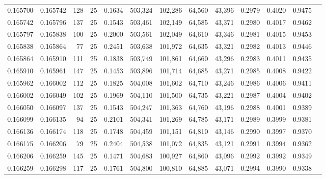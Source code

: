 \begin{tabular}{rrrrrrrrrrrrr}
0.165700 & 0.165742 &   128 &  25 &                                     0.1634 & 503,324 & 102,286 &  64,560 &  43,396 & 0.2979 & 0.4020 & 0.9475 \\
0.165742 & 0.165796 &   137 &  25 &                                     0.1543 & 503,461 & 102,149 &  64,585 &  43,371 & 0.2980 & 0.4017 & 0.9462 \\
0.165797 & 0.165838 &   100 &  25 &                                     0.2000 & 503,561 & 102,049 &  64,610 &  43,346 & 0.2981 & 0.4015 & 0.9453 \\
0.165838 & 0.165864 &    77 &  25 &                                     0.2451 & 503,638 & 101,972 &  64,635 &  43,321 & 0.2982 & 0.4013 & 0.9446 \\
0.165864 & 0.165910 &   111 &  25 &                                     0.1838 & 503,749 & 101,861 &  64,660 &  43,296 & 0.2983 & 0.4011 & 0.9435 \\
0.165910 & 0.165961 &   147 &  25 &                                     0.1453 & 503,896 & 101,714 &  64,685 &  43,271 & 0.2985 & 0.4008 & 0.9422 \\
0.165962 & 0.166002 &   112 &  25 &                                     0.1825 & 504,008 & 101,602 &  64,710 &  43,246 & 0.2986 & 0.4006 & 0.9411 \\
0.166002 & 0.166049 &   102 &  25 &                                     0.1969 & 504,110 & 101,500 &  64,735 &  43,221 & 0.2987 & 0.4004 & 0.9402 \\
0.166050 & 0.166097 &   137 &  25 &                                     0.1543 & 504,247 & 101,363 &  64,760 &  43,196 & 0.2988 & 0.4001 & 0.9389 \\
0.166099 & 0.166135 &    94 &  25 &                                     0.2101 & 504,341 & 101,269 &  64,785 &  43,171 & 0.2989 & 0.3999 & 0.9381 \\
0.166136 & 0.166174 &   118 &  25 &                                     0.1748 & 504,459 & 101,151 &  64,810 &  43,146 & 0.2990 & 0.3997 & 0.9370 \\
0.166175 & 0.166206 &    79 &  25 &                                     0.2404 & 504,538 & 101,072 &  64,835 &  43,121 & 0.2991 & 0.3994 & 0.9362 \\
0.166206 & 0.166259 &   145 &  25 &                                     0.1471 & 504,683 & 100,927 &  64,860 &  43,096 & 0.2992 & 0.3992 & 0.9349 \\
0.166259 & 0.166298 &   117 &  25 &                                     0.1761 & 504,800 & 100,810 &  64,885 &  43,071 & 0.2994 & 0.3990 & 0.9338 \\

\end{tabular}
